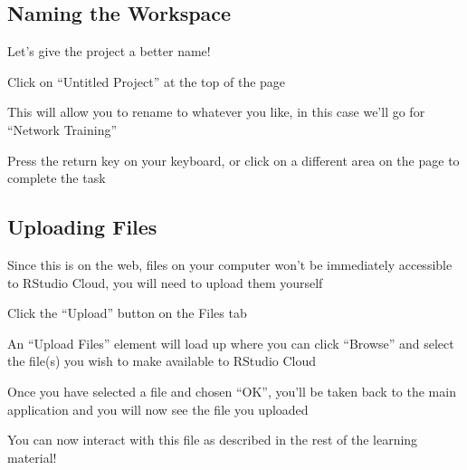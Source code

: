 \documentclass[]{book}
\begin{document}
\hypertarget{naming-the-workspace}{%
\subsection{Naming the Workspace}\label{naming-the-workspace}}

Let's give the project a better name!

Click on ``Untitled Project'' at the top of the page

This will allow you to rename to whatever you like, in this case we'll go for ``Network Training''

Press the return key on your keyboard, or click on a different area on the page to complete the task

\hypertarget{uploading-files}{%
\subsection{Uploading Files}\label{uploading-files}}

Since this is on the web, files on your computer won't be immediately accessible to RStudio Cloud, you will need to upload them yourself

Click the ``Upload'' button on the Files tab

An ``Upload Files'' element will load up where you can click ``Browse'' and select the file(s) you wish to make available to RStudio Cloud

Once you have selected a file and chosen ``OK'', you'll be taken back to the main application and you will now see the file you uploaded

You can now interact with this file as described in the rest of the learning material!


\end{document}
